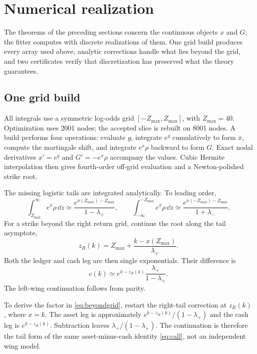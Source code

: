 \section{Numerical realization}
\label{sec:numerics}

The theorems of the preceding sections concern the continuous objects $x$
and $G$; the fitter computes with discrete realizations of them.  One grid
build produces every array used above, analytic corrections handle what lies
beyond the grid, and two certificates verify that discretization has
preserved what the theory guarantees.

\subsection{One grid build}

All integrals use a symmetric log-odds grid
$[-Z_{\max},Z_{\max}]$, with $Z_{\max}=40$.  Optimization uses 2001 nodes;
the accepted slice is rebuilt on 8001 nodes.  A build performs four operations:
evaluate $g$, integrate $e^g$ cumulatively to form $\bar x$, compute the
martingale shift, and integrate $e^x\rho$ backward to form $G$.  Exact nodal
derivatives $x'=e^g$ and $G'=-e^x\rho$ accompany the values.  Cubic Hermite
interpolation then gives fourth-order off-grid evaluation and a
Newton-polished strike root.

The missing logistic tails are integrated analytically.  To leading order,
\begin{equation}
\int_{Z_{\max}}^\infty e^{\bar x}\rho\,\dd z
\simeq\frac{e^{\bar x(Z_{\max})-Z_{\max}}}{1-\lambda_+},
\qquad
\int_{-\infty}^{-Z_{\max}}e^{\bar x}\rho\,\dd z
\simeq\frac{e^{\bar x(-Z_{\max})-Z_{\max}}}{1+\lambda_-}.
\label{eq:tailcorr}
\end{equation}
For a strike beyond the right return grid, continue the root along the tail
asymptote,
\[
z_R(k)=Z_{\max}+\frac{k-x(Z_{\max})}{\lambda_+}.
\]
Both the ledger and cash leg are then single exponentials.  Their difference
is
\begin{equation}
c(k)\simeq e^{k-z_R(k)}\frac{\lambda_+}{1-\lambda_+}.
\label{eq:beyondgrid}
\end{equation}
The left-wing continuation follows from parity.

To derive the factor in \eqref{eq:beyondgrid}, restart the right-tail
correction at $z_R(k)$, where $x=k$.  The asset leg is approximately
$e^{k-z_R(k)}/(1-\lambda_+)$ and the cash leg is $e^{k-z_R(k)}$.
Subtraction leaves $\lambda_+/(1-\lambda_+)$.  The continuation is therefore
the tail form of the same asset-minus-cash identity \eqref{eq:call}, not an
independent wing model.

